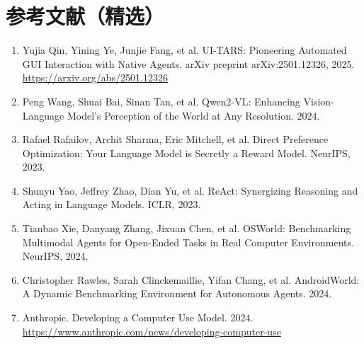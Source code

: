 \documentclass[11pt,UTF8,fontset=fandol]{ctexart}
\begin{document}
\section*{参考文献（精选）}
\begin{enumerate}[leftmargin=2em]
\item Yujia Qin, Yining Ye, Junjie Fang, et al. UI-TARS: Pioneering Automated GUI Interaction with Native Agents. arXiv preprint arXiv:2501.12326, 2025. \url{https://arxiv.org/abs/2501.12326}
\item Peng Wang, Shuai Bai, Sinan Tan, et al. Qwen2-VL: Enhancing Vision-Language Model's Perception of the World at Any Resolution. 2024.
\item Rafael Rafailov, Archit Sharma, Eric Mitchell, et al. Direct Preference Optimization: Your Language Model is Secretly a Reward Model. NeurIPS, 2023.
\item Shunyu Yao, Jeffrey Zhao, Dian Yu, et al. ReAct: Synergizing Reasoning and Acting in Language Models. ICLR, 2023.
\item Tianbao Xie, Danyang Zhang, Jixuan Chen, et al. OSWorld: Benchmarking Multimodal Agents for Open-Ended Tasks in Real Computer Environments. NeurIPS, 2024.
\item Christopher Rawles, Sarah Clinckemaillie, Yifan Chang, et al. AndroidWorld: A Dynamic Benchmarking Environment for Autonomous Agents. 2024.
\item Anthropic. Developing a Computer Use Model. 2024. \url{https://www.anthropic.com/news/developing-computer-use}
\end{enumerate}
\end{document}
